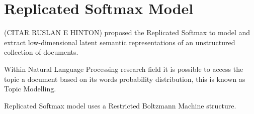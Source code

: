 \section{Replicated Softmax Model}%
\label{app:rsm}%

(CITAR RUSLAN E HINTON) proposed the Replicated Softmax to model and extract low-dimensional latent semantic representations of an unstructured collection of documents. 

Within Natural Language Processing research field it is possible to access the topic a document based on its words probability distribution, this is known as Topic Modelling. 

Replicated Softmax model uses a Restricted Boltzmann Machine structure.


